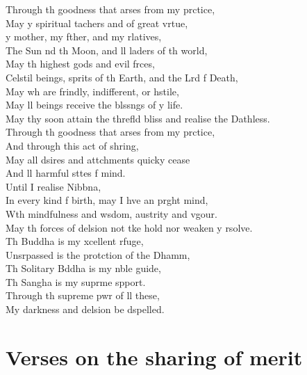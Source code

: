 Through th goodness that arses from my prctice,\\
May y spiritual tachers and  of great vrtue,\\
y mother, my fther, and my rlatives,\\
The Sun nd th Moon, and ll  laders of th world,\\
May th highest gods and evil frces,\\
Celstil beings,  sprits of th Earth, and the Lrd f Death,\\
May  wh are frindly, indifferent, or hstile,\\
May ll beings receive the blssngs of y life.\\
May thy soon attain the threfld bliss and realise the Dathless.\\
Through th goodness that arses from my prctice,\\
And through this act of shring,\\
May all dsires and attchments quicky cease\\
And ll harmful sttes f mind.\\
Until I realise Nibbna,\\
In every kind f birth, may I hve an prght mind,\\
Wth mindfulness and wsdom, austrity and vgour.\\
May th forces of delsion not tke hold nor weaken y rsolve.\\
Th Buddha is my xcellent rfuge,\\
Unsrpassed is the protction of the Dhamm,\\
Th Solitary Bddha is my nble guide,\\
Th Sangha is my suprme spport.\\
Through th supreme pwr of ll these,\\
My darkness and delsion be dspelled.
\chapter{Verses on the sharing of merit}

